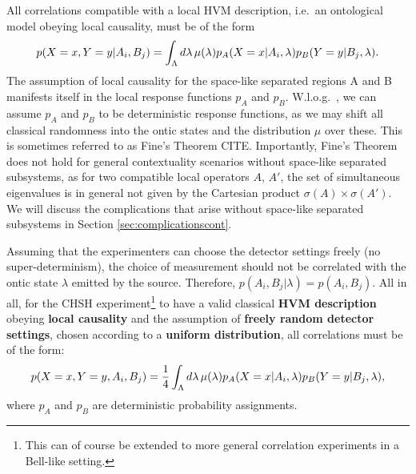 All correlations compatible with a local HVM description, i.e.\ an ontological model obeying local causality, must be of the form
\begin{equation*}
p(X=x,Y=y\vert A_i,B_j)=\int_{\Lambda}d\lambda\thinspace\mu(\lambda)p_{A}(X=x\vert A_i, \lambda)p_{B}(Y=y\vert B_j, \lambda).
\end{equation*}
The assumption of local causality for the space-like separated regions A and B manifests itself in the local response functions $p_A$ and $p_B$. W.l.o.g.\ , we can assume $p_A$ and $p_B$ to be deterministic response functions, as we may shift all classical randomness into the ontic states and the distribution $\mu$ over these. This is sometimes referred to as Fine's Theorem CITE. Importantly, Fine's Theorem does not hold for general contextuality scenarios without space-like separated subsystems, as for two compatible local operators $A$, $A'$, the set of simultaneous eigenvalues is in general not given by the Cartesian product $\sigma(A)\times\sigma(A')$. We will discuss the complications that arise without space-like separated subsystems in Section \ref{sec:complicationscont}.

Assuming that the experimenters can choose the detector settings freely (no super-determinism), the choice of measurement should not be correlated with the ontic state $\lambda$ emitted by the source. Therefore, $p(A_i,B_j\vert \lambda)=p(A_i,B_j)$. All in all, for the CHSH experiment\footnote{This can of course be extended to more general correlation experiments in a Bell-like setting.} to have a valid classical \textbf{HVM description} obeying \textbf{local causality} and the assumption of \textbf{freely random detector settings}, chosen according to a \textbf{uniform distribution}, all correlations must be of the form:
\begin{equation}
\label{eqn:lhvm}
p(X=x,Y=y,A_i,B_j)=\frac{1}{4}\int_{\Lambda}d\lambda\thinspace\mu(\lambda)p_{A}(X=x\vert A_i, \lambda)p_{B}(Y=y\vert B_j, \lambda),
\end{equation}
where $p_A$ and $p_B$ are deterministic probability assignments.

